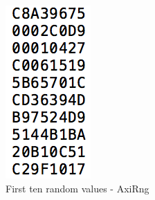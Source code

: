 \begin{figure}[!h]
\includegraphics[scale=0.5]{images/rngVal.png}
\caption{First ten random values - AxiRng}
\label{f8}
\end{figure}
